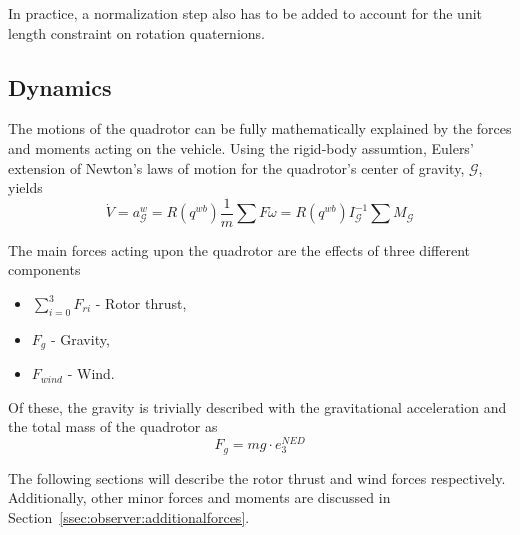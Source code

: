         In practice, a normalization step also has to be added to account for
        the unit length constraint on rotation quaternions.


    \subsection{Dynamics}
        The motions of the quadrotor can be fully mathematically explained by the
        forces and moments acting on the vehicle. Using the rigid-body assumtion,
        Eulers' extension of Newton's laws of motion for the
        quadrotor's center of gravity, $\mathcal{G}$, yields
        \begin{subequations}
            \begin{equation}
                \dot{V} = a^{w}_{\mathcal{G}} = R(q^{wb})\frac{1}{m}\sum F
            \end{equation}
            \begin{equation}
                \dot{\omega} = R(q^{wb})I_{\mathcal{G}}^{-1}\sum M_{\mathcal{G}}
            \end{equation}
        \end{subequations}

        The main forces acting upon the quadrotor are the effects of three different components
        \begin{itemize}
            \item $\sum_{i=0}^{3}F_{ri}$ - Rotor thrust,
            \item $F_{g}$ - Gravity,
            \item $F_{wind}$ - Wind.
        \end{itemize}

        Of these, the gravity is trivially described with the
        gravitational acceleration and the total mass of the quadrotor as
        \begin{equation}
            F_{g} = mg\cdot e_{3}^{NED}
        \end{equation}

        The following sections will describe the rotor thrust and wind forces respectively.
        Additionally, other minor forces and moments are discussed in
        Section~\ref{ssec:observer:additionalforces}.

        
        
        

